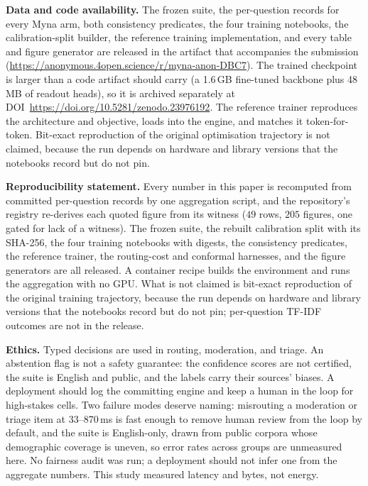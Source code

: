 \documentclass[11pt]{article}
\begin{document}
\textbf{Data and code availability.}
The frozen suite, the per-question records for every Myna{} arm, both consistency predicates, the
four training notebooks, the calibration-split builder, the reference training implementation, and
every table and figure generator are released in the artifact that accompanies the submission
(\url{https://anonymous.4open.science/r/myna-anon-DBC7}). The
trained checkpoint is larger than a code artifact should carry (a 1.6\,GB fine-tuned backbone plus
48\,MB of readout heads), so it is archived separately at
DOI~\url{https://doi.org/10.5281/zenodo.23976192}. The reference trainer reproduces the architecture and
objective, loads into the engine, and matches it token-for-token.
Bit-exact reproduction of the original optimisation trajectory is not claimed, because the run
depends on hardware and library versions that the notebooks record but do not pin.

\textbf{Reproducibility statement.}
Every number in this paper is recomputed from committed per-question records by one aggregation
script, and the repository's registry re-derives each quoted figure from its witness
($49$ rows, $205$ figures, one gated for lack of a witness). The frozen suite, the rebuilt
calibration split with its SHA-256, the four training notebooks with digests, the consistency
predicates, the reference trainer, the routing-cost and conformal harnesses, and the figure
generators are all released. A container recipe builds the environment and runs the aggregation
with no GPU. What is not claimed is bit-exact reproduction of the original training trajectory,
because the run depends on hardware and library versions that the notebooks record but do not pin;
per-question TF-IDF outcomes are not in the release.

\textbf{Ethics.}
Typed decisions are used in routing, moderation, and triage. An abstention flag is not a safety
guarantee: the confidence scores are not certified, the suite is English and public, and the labels
carry their sources' biases. A deployment should log the committing engine and keep a human in the
loop for high-stakes cells. Two failure modes deserve naming: misrouting a moderation or triage
item at 33--870\,ms is fast enough to remove human review from the loop by default, and the suite is
English-only, drawn from public corpora whose demographic coverage is uneven, so error rates across
groups are unmeasured here. No fairness audit was run; a deployment should not infer one from the
aggregate numbers. This study measured latency and bytes, not energy.
\end{document}
